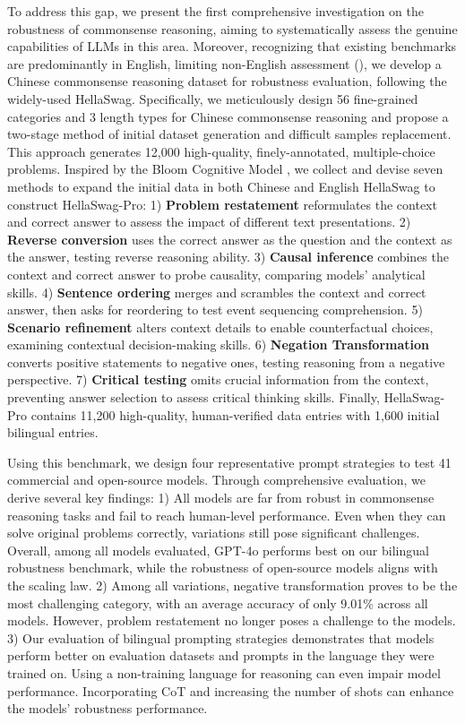 To address this gap, we present the first comprehensive investigation on the robustness of commonsense reasoning, aiming to systematically assess the genuine capabilities of LLMs in this area. 
Moreover, recognizing that existing benchmarks are predominantly in English, limiting non-English assessment (\citealp{davis2023benchmarks}), we develop a Chinese commonsense reasoning dataset for robustness evaluation, following the widely-used HellaSwag. 
Specifically, we meticulously design 56 fine-grained categories and 3 length types for Chinese commonsense reasoning and propose a two-stage method of initial dataset generation and difficult samples replacement. This approach generates 12,000 high-quality, finely-annotated, multiple-choice problems. Inspired by the Bloom Cognitive
Model \cite{krathwohl1973taxonomy}, we collect and devise seven methods to expand the initial data in both Chinese and English HellaSwag to construct HellaSwag-Pro:
1) \textbf{Problem restatement} reformulates the context and correct answer to assess the impact of different text presentations.
2) \textbf{Reverse conversion} uses the correct answer as the question and the context as the answer, testing reverse reasoning ability.
3) \textbf{Causal inference} combines the context and correct answer to probe causality, comparing models' analytical skills.
4) \textbf{Sentence ordering} merges and scrambles the context and correct answer, then asks for reordering to test event sequencing comprehension.
5) \textbf{Scenario refinement} alters context details to enable counterfactual choices, examining contextual decision-making skills.
6) \textbf{Negation Transformation} converts positive statements to negative ones, testing reasoning from a negative perspective.
7) \textbf{Critical testing} omits crucial information from the context, preventing answer selection to assess critical thinking skills. Finally, HellaSwag-Pro contains 11,200 high-quality, human-verified data entries with 1,600 initial bilingual entries.

Using this benchmark, we design four representative prompt strategies to test 41 commercial and open-source models. Through comprehensive evaluation, we derive several key findings:
1) All models are far from robust in commonsense reasoning tasks and fail to reach human-level performance. Even when they can solve original problems correctly, variations still pose significant challenges. Overall, among all models evaluated, GPT-4o performs best on our bilingual robustness benchmark, while the robustness of open-source models aligns with the scaling law.
2) Among all variations, negative transformation proves to be the most challenging category, with an average accuracy of only 9.01\% across all models. However, problem restatement no longer poses a challenge to the models.
3) Our evaluation of bilingual prompting strategies demonstrates that models perform better on evaluation datasets and prompts in the language they were trained on. Using a non-training language for reasoning can even impair model performance. Incorporating CoT and increasing the number of shots can enhance the models' robustness performance.

